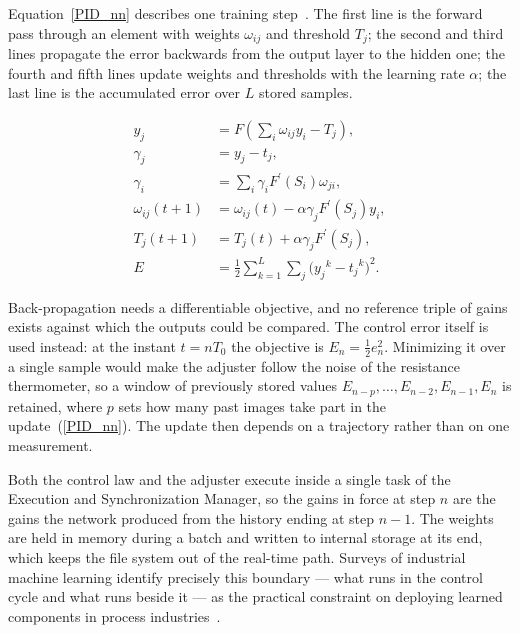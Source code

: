 Equation~\ref{PID_nn} describes one training step~\cite{ivaniuk2013neuro}. The
first line is the forward pass through an element with weights $\omega_{ij}$ and
threshold $T_j$; the second and third lines propagate the error backwards from
the output layer to the hidden one; the fourth and fifth lines update weights
and thresholds with the learning rate $\alpha$; the last line is the accumulated
error over $L$ stored samples.

\begin{equation}\label{PID_nn}
  \begin{aligned}
    y_j       & = F(\sum_{i}{\omega_{i j}y_i - T_j}),                         \\
    \gamma_j  & = y_j - t_j,                                                  \\
    \gamma_i  & = \sum_{i}{\gamma_iF^\prime(S_i)\omega_{j i}},                \\
    \omega_{i j}(t + 1) & = \omega_{i j}(t) - \alpha\gamma_jF^\prime(S_j)y_i, \\
    T_j(t + 1)& = T_j(t) + \alpha\gamma_jF^\prime(S_j),                       \\
    E         & = \frac{1}{2}\sum_{k = 1}^{L}{\sum_{j}{({y_j}^k} - {t_j}^k)^2}.
  \end{aligned}
\end{equation}

Back-propagation needs a differentiable objective, and no reference triple of
gains exists against which the outputs could be compared. The control error
itself is used instead: at the instant $t = n T_0$ the objective is $E_n =
\frac{1}{2}e_n^2$. Minimizing it over a single sample would make the adjuster
follow the noise of the resistance thermometer, so a window of previously stored
values $E_{n-p}, \dots, E_{n-2}, E_{n-1}, E_n$ is retained, where $p$ sets how
many past images take part in the update~(\ref{PID_nn}). The update then depends
on a trajectory rather than on one measurement.

Both the control law and the adjuster execute inside a single task of the
Execution and Synchronization Manager, so the gains in force at step $n$ are the
gains the network produced from the history ending at step $n-1$. The weights
are held in memory during a batch and written to internal storage at its end,
which keeps the file system out of the real-time path. Surveys of industrial
machine learning identify precisely this boundary --- what runs in the control
cycle and what runs beside it --- as the practical constraint on deploying
learned components in process industries~\cite{Lawrence2024}.

